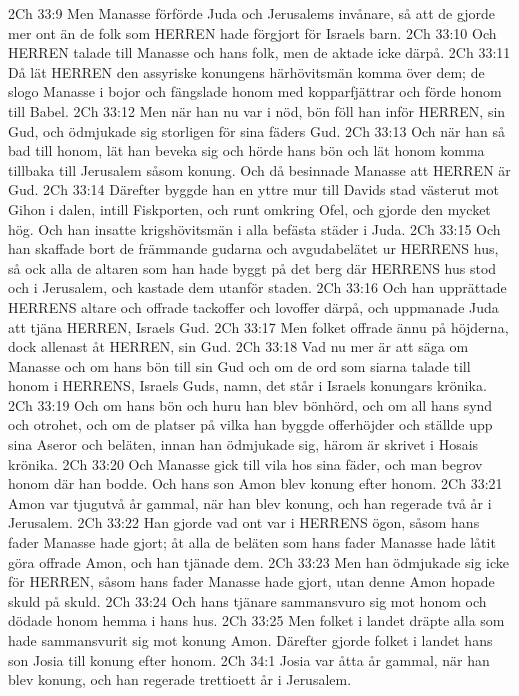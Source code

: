 2Ch 33:9  Men Manasse förförde Juda och Jerusalems invånare, så att de gjorde mer ont än de folk som HERREN hade förgjort för Israels barn.
2Ch 33:10  Och HERREN talade till Manasse och hans folk, men de aktade icke därpå.
2Ch 33:11  Då lät HERREN den assyriske konungens härhövitsmän komma över dem; de slogo Manasse i bojor och fängslade honom med kopparfjättrar och förde honom till Babel.
2Ch 33:12  Men när han nu var i nöd, bön föll han inför HERREN, sin Gud, och ödmjukade sig storligen för sina fäders Gud.
2Ch 33:13  Och när han så bad till honom, lät han beveka sig och hörde hans bön och lät honom komma tillbaka till Jerusalem såsom konung. Och då besinnade Manasse att HERREN är Gud.
2Ch 33:14  Därefter byggde han en yttre mur till Davids stad västerut mot Gihon i dalen, intill Fiskporten, och runt omkring Ofel, och gjorde den mycket hög. Och han insatte krigshövitsmän i alla befästa städer i Juda.
2Ch 33:15  Och han skaffade bort de främmande gudarna och avgudabelätet ur HERRENS hus, så ock alla de altaren som han hade byggt på det berg där HERRENS hus stod och i Jerusalem, och kastade dem utanför staden.
2Ch 33:16  Och han upprättade HERRENS altare och offrade tackoffer och lovoffer därpå, och uppmanade Juda att tjäna HERREN, Israels Gud.
2Ch 33:17  Men folket offrade ännu på höjderna, dock allenast åt HERREN, sin Gud.
2Ch 33:18  Vad nu mer är att säga om Manasse och om hans bön till sin Gud och om de ord som siarna talade till honom i HERRENS, Israels Guds, namn, det står i Israels konungars krönika.
2Ch 33:19  Och om hans bön och huru han blev bönhörd, och om all hans synd och otrohet, och om de platser på vilka han byggde offerhöjder och ställde upp sina Aseror och beläten, innan han ödmjukade sig, härom är skrivet i Hosais krönika.
2Ch 33:20  Och Manasse gick till vila hos sina fäder, och man begrov honom där han bodde. Och hans son Amon blev konung efter honom.
2Ch 33:21  Amon var tjugutvå år gammal, när han blev konung, och han regerade två år i Jerusalem.
2Ch 33:22  Han gjorde vad ont var i HERRENS ögon, såsom hans fader Manasse hade gjort; åt alla de beläten som hans fader Manasse hade låtit göra offrade Amon, och han tjänade dem.
2Ch 33:23  Men han ödmjukade sig icke för HERREN, såsom hans fader Manasse hade gjort, utan denne Amon hopade skuld på skuld.
2Ch 33:24  Och hans tjänare sammansvuro sig mot honom och dödade honom hemma i hans hus.
2Ch 33:25  Men folket i landet dräpte alla som hade sammansvurit sig mot konung Amon. Därefter gjorde folket i landet hans son Josia till konung efter honom.
2Ch 34:1  Josia var åtta år gammal, när han blev konung, och han regerade trettioett år i Jerusalem.
